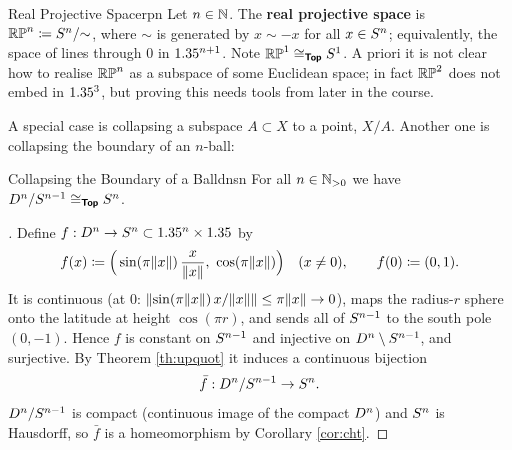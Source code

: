 

\begin{example}{Real Projective Space}{rpn}
    Let $n\in\mathbb{N}$. The \textbf{real projective space} is $\mathbb{RP}^{n}\coloneqq S^{n}/{\sim}$, where $\sim$ is generated by $x\sim -x$ for all $x\in S^{n}$; equivalently, the space of lines through $0$ in $1.35^{n+1}$. Note $\mathbb{RP}^{1}\cong_{\bm{\mathsf{Top}}}S^{1}$. A priori it is not clear how to realise $\mathbb{RP}^{n}$ as a subspace of some Euclidean space; in fact $\mathbb{RP}^{2}$ does not embed in $1.35^3$, but proving this needs tools from later in the course.
\end{example}

\newpage
A special case is collapsing a subspace $A\subset X$ to a point, $X/A$. Another one is collapsing the boundary of an $n$-ball:

\begin{proposition}{Collapsing the Boundary of a Ball}{dnsn}
    For all $n\in\mathbb{N}_{>0}$ we have $D^{n}/S^{n-1}\cong_{\bm{\mathsf{Top}}}S^{n}$.
\end{proposition}
\begin{proof}[]
    Define $f:D^{n}\to S^{n}\subset1.35^n\times1.35$ by \[
    f(x)\coloneqq\Big(\sin(\pi\norm{x})\,\frac{x}{\norm{x}},\ \cos(\pi\norm{x})\Big)\quad (x\neq0),\qquad f(0)\coloneqq(0,1).
    \]
    It is continuous (at $0$: $\lVert\sin(\pi\lVert x\rVert)\,x/\lVert x\rVert\rVert\leq\pi\lVert x\rVert\to0$), maps the radius-$r$ sphere onto the latitude at height $\cos(\pi r)$, and sends all of $S^{n-1}$ to the south pole $(0,-1)$. Hence $f$ is constant on $S^{n-1}$ and injective on $D^{n}\setminus S^{n-1}$, and surjective. By Theorem \ref{th:upquot} it induces a continuous bijection \[
    \bar f:D^{n}/S^{n-1}\to S^{n}.
    \]
    $D^{n}/S^{n-1}$ is compact (continuous image of the compact $D^{n}$) and $S^{n}$ is Hausdorff, so $\bar f$ is a homeomorphism by Corollary \ref{cor:cht}.
\end{proof}

